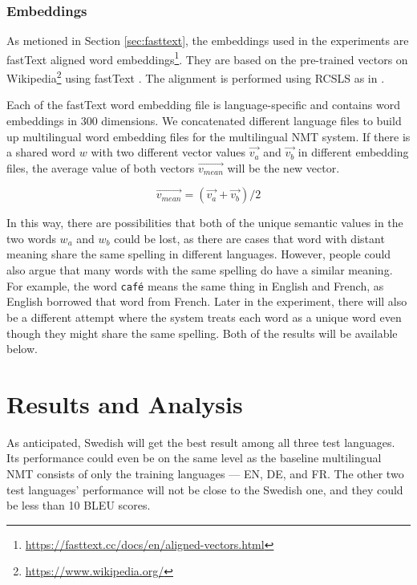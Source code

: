 \documentclass[thesis,fonts=libertine]{cluu}
\begin{document}
\subsection{Embeddings}

As metioned in Section \ref{sec:fasttext}, the embeddings used in the experiments are fastText aligned word embeddings\footnote{\url{https://fasttext.cc/docs/en/aligned-vectors.html}}. They are based on the pre-trained vectors on Wikipedia\footnote{\url{https://www.wikipedia.org/}} using fastText \parencite{Bojanowski:2016aa}. The alignment is performed using RCSLS as in \textcite{Joulin:2018aa}.

Each of the fastText word embedding file is language-specific and contains word embeddings in 300 dimensions. We concatenated different language files to build up multilingual word embedding files for the multilingual NMT system. If there is a shared word $w$ with two different vector values $\vec{v_a}$ and $\vec{v_b}$ in different embedding files, the average value of both vectors $\vec{v_{mean}}$ will be the new vector.

\begin{equation}
 \vec{v_{mean}} = (\vec{v_a} + \vec{v_b}) / 2
\end{equation}

In this way, there are possibilities that both of the unique semantic values in the two words $w_a$ and $w_b$ could be lost, as there are cases that word with distant meaning share the same spelling in different languages. However, people could also argue that many words with the same spelling do have a similar meaning. For example, the word \verb|café| means the same thing in English and French, as English borrowed that word from French. Later in the experiment, there will also be a different attempt where the system treats each word as a unique word even though they might share the same spelling. Both of the results will be available below.

\chapter{Results and Analysis}
\label{chap:results}

As anticipated, Swedish will get the best result among all three test languages. Its performance could even be on the same level as the baseline multilingual NMT consists of only the training languages --- EN, DE, and FR. The other two test languages' performance will not be close to the Swedish one, and they could be less than 10 BLEU scores.
\end{document}
